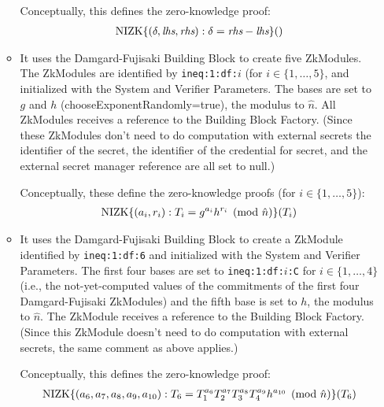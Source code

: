 \begin{itemize}
\begin{itemize}
Conceptually, this defines the zero-knowledge proof:
\begin{align}
\label{eq:ex:rangeProof:partial:first}
\operatorname{NIZK}\lbrace(\delta, \emph{lhs}, \emph{rhs}): \delta = \emph{rhs}-\emph{lhs}\rbrace()
\end{align}

\item It uses the Damgard-Fujisaki Building Block to create five ZkModules. The ZkModules are identified by
\texttt{ineq:1:df:$i$} (for $i\in\lbrace1, \ldots, 5\rbrace$, and initialized with the System and Verifier Parameters.
The bases are set to $g$ and $h$ (chooseExponentRandomly=true), the modulus to $\hat n$.
All ZkModules receives a reference to the Building Block Factory.
(Since these ZkModules don't need to do computation with external secrets
the identifier of the secret, the identifier of the credential for secret, and the external secret manager reference are all set to null.)

Conceptually, these define the zero-knowledge proofs (for $i \in \lbrace 1, \ldots, 5 \rbrace$):
\begin{align}
\operatorname{NIZK}\lbrace(a_i, r_i): T_i = g^{a_i} h^{r_i} \pmod{\hat n}\rbrace(T_i)
\end{align}

\item It uses the Damgard-Fujisaki Building Block to create a ZkModule identified by \texttt{ineq:1:df:6} and initialized
with the System and Verifier Parameters. The first four bases are set
to \texttt{ineq:1:df:$i$:C} for $i\in\lbrace1, \ldots, 4\rbrace$ (i.e., the not-yet-computed values of the commitments of the
first four Damgard-Fujisaki ZkModules) and the fifth base is set to $h$, the modulus to $\hat n$.
The ZkModule receives a reference to the Building Block Factory.
(Since this ZkModule doesn't need to do computation with external secrets, the same comment as above applies.)

Conceptually, this defines the zero-knowledge proof:
\begin{align}
\operatorname{NIZK}\lbrace(a_6, a_7, a_8, a_9, a_{10}): T_6 = T_1^{a_6} T_2^{a_7}T_3^{a_8}T_4^{a_9} h^{a_{10}} \pmod{\hat n}\rbrace(T_6)
\end{align}


\end{itemize}
\end{itemize}
